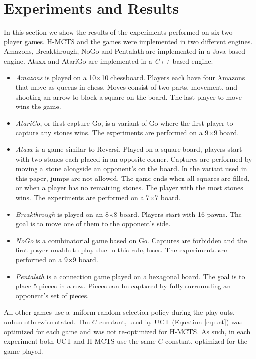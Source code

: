 \documentclass[a4paper]{llncs}
\begin{document}
\section{Experiments and Results}
\label{sec:exp_res}
In this section we show the results of the experiments performed on six two-player games. H-MCTS and the games were implemented in two different engines. Amazons, Breakthrough, NoGo and Pentalath are implemented in a Java based engine. Ataxx and AtariGo are implemented in a \emph{C++} based engine.
\begin{itemize}
\item \emph{Amazons} is played on a 10$\times$10 chessboard. Players each have four Amazons that move as queens in chess. Moves consist of two parts, movement, and shooting an arrow to block a square on the board. The last player to move wins the game.
\item \emph{AtariGo}, or first-capture Go, is a variant of Go where the first player to capture any stones wins. The experiments are performed on a 9$\times$9 board.
\item \emph{Ataxx} is a game similar to Reversi. Played on a square board, players start with two stones each placed in an opposite corner. Captures are performed by moving a stone alongside an opponent's on the board. In the variant used in this paper, jumps are not allowed. The game ends when all squares are filled, or when a player has no remaining stones. The player with the most stones wins.  The experiments are performed on a 7$\times$7 board.
\item \emph{Breakthrough} is played on an 8$\times$8 board. Players start with 16 pawns. The goal is to move one of them to the opponent's side.
\item \emph{NoGo} is a combinatorial game based on Go. Captures are forbidden and the first player unable to play due to this rule, loses. The experiments are performed on a 9$\times$9 board.
\item \emph{Pentalath} is a connection game played on a hexagonal board. The goal is to place 5 pieces in a row. Pieces can be captured by fully surrounding an opponent's set of pieces.
\end{itemize}

All other games use a uniform random selection policy during the play-outs, unless otherwise stated. The $C$ constant, used by UCT (Equation \ref{eq:uct}) was optimized for each game and was not re-optimized for H-MCTS. As such, in each experiment both UCT and H-MCTS use the same $C$ constant, optimized for the game played.
\end{document}
